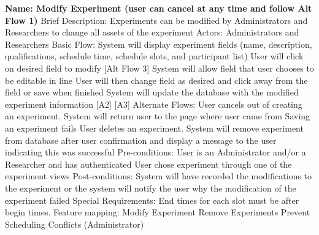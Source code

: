 \begin{outline}[enumerate]
\1 {\bf Name: Modify Experiment (user can cancel at any time and follow Alt Flow 1)}
\2 Brief Description: Experiments can be modified by Administrators and Researchers to change all assets of the experiment
\2 Actors: Administrators and Researchers
\2 Basic Flow:
\3 System will display experiment fields (name, description, qualifications, schedule time, schedule slots, and participant list)
\3 User will click on desired field to modify [Alt Flow 3]
\3 System will allow field that user chooses to be editable in line
\3 User will then change field as desired and click away from the field or save when finished
\3 System will update the database with the modified experiment information [A2] [A3]
\2 Alternate Flows:
\3 [A1] User cancels out of creating an experiment. System will return user to the page where user came from
\3 [A2] Saving an experiment fails
\3 [A3] User deletes an experiment. System will remove experiment from database after user confirmation and display a message to the user indicating this was successful
\2 Pre-conditions:
\3 User is an Administrator and/or a Researcher and has authenticated
\3 User chose experiment through one of the experiment views
\2 Post-conditions:
\3 System will have recorded the modifications to the experiment or the system will notify the user why the modification of the experiment failed
\2 Special Requirements:
\3 End times for each slot must be after begin times.
\2 Feature mapping:
\3 Modify Experiment
\3 Remove Experiments
\3 Prevent Scheduling Conflicts (Administrator)

\end{outline}
